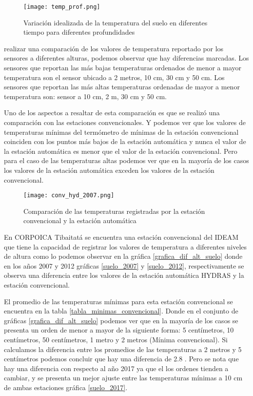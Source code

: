 \begin{figure}[H]
	\begin{center}
\texttt{[image: temp\_prof.png]}
	\caption{Variación idealizada de la temperatura del suelo en diferentes tiempo para diferentes profundidades}
	 \label{gra:tmp_soil}
	\end{center}
\end{figure}

realizar una comparación de los valores de temperatura reportado por los sensores a diferentes alturas, podemos observar que hay diferencias marcadas. Los sensores que reportan las más bajas temperaturas ordenados de menor a mayor temperatura son el sensor ubicado a 2 metros, 10 cm, 30 cm y 50 cm. Los sensores que reportan las más altas temperaturas ordenadas de mayor a menor temperatura son: sensor a 10 cm, 2 m, 30 cm y 50 cm.

Uno de los aspectos a resaltar de esta comparación es que se realizó una comparación con las estaciones convencionales. Y podemos ver que los valores de temperaturas mínimas del termómetro de mínimas de la estación convencional coinciden con los puntos más bajos de la estación automática y nunca el valor de la estación automática es menor que el valor de la estación convencional. Pero para el caso de las temperaturas altas podemos ver que en la mayoría de los casos los valores de la estación automática exceden los valores de la estación convencional.

 

\begin{figure}[H]
	\begin{center}
	\texttt{[image: conv\_hyd\_2007.png]}
		\caption{Comparación de las temperaturas registradas por la estación convencional y la estación automática}
		\label{subfig:b1}
	\end{center}
\end{figure}

En CORPOICA Tibaitatá se encuentra una estación convencional del IDEAM que tiene la capacidad de registrar los valores de temperatura a diferentes niveles de altura como lo podemos observar en la gráfica \ref{grafica_dif_alt_suelo} donde en los años 2007 y 2012 gráficas \ref{suelo_2007} y \ref{suelo_2012}, respectivamente se observa una diferencia entre los valores de la estación automática HYDRAS y la estación convencional.

El promedio de las temperaturas mínimas para esta estación convencional se encuentra en la tabla \ref{tabla_minimas_convencional}. Donde en el conjunto de gráficas \ref{grafica_dif_alt_suelo} podemos ver que en la mayoría de los casos se presenta un orden de menor a mayor de la siguiente forma: 5 centímetros, 10 centímetros, 50 centímetros, 1 metro y 2 metros (Mínima convencional). Si calculamos la diferencia entre los promedios de las temperaturas a 2 metros y 5 centímetros podemos concluir que hay una diferencia de 2.8 \celc. Pero se nota que hay una diferencia con respecto al año 2017 ya que el los ordenes tienden a cambiar, y se presenta un mejor ajuste entre las temperaturas mínimas a 10 cm de ambas estaciones gráfica \ref{suelo_2017}.



